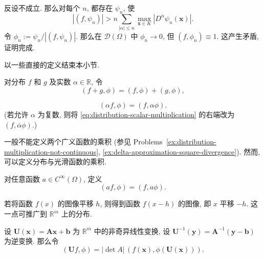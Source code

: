 \begin{Proof}
反设不成立. 那么对每个 $n$, 都存在 $\psi_n$, 使\[|(f,\psi_n)|>n\sum_{|\alpha|\leq n}\max_{\bm{x}\in K}|D^\alpha\psi_n(\bm{x})|.\]令 $\phi_n:=\psi_n/|(f,\psi_n)|$. 那么在 $\mathcal{D}(\Omega)$ 中 $\phi_n\to0$, 但 $(f,\phi_n)\equiv1$. 这产生矛盾, 证明完成.
\end{Proof}

以一些直接的定义结束本小节.

\begin{Definition}
\label{def:distribution-linear-operations}
对分布 $f$ 和 $g$ 及实数 $\alpha\in\mathbb{R}$, 令
\begin{equation}\label{eq:distribution-addition}
(f+g,\phi)=(f,\phi)+(g,\phi),
\end{equation}

\begin{equation}\label{eq:distribution-scalar-multiplication}
(\alpha f,\phi)=(f,\alpha\phi).
\end{equation}
(若允许 $\alpha$ 为复数, 则将 \eqref{eq:distribution-scalar-multiplication} 的右端改为 $(f,\overline\alpha\phi)$.)
\end{Definition}

\begin{Remark}
\label{rem:distribution-products}
一般不能定义两个广义函数的乘积 (参见 Problems~\ref{ex:distribution-multiplication-not-continuous}, \ref{ex:delta-approximation-square-divergence}). 然而, 可以定义分布与光滑函数的乘积.
\end{Remark}

\begin{Definition}
\label{def:distribution-smooth-product}
对任意函数 $a\in C^\infty(\Omega)$, 定义
\begin{equation}\label{eq:distribution-smooth-function-product}
(af,\phi)=(f,a\phi).
\end{equation}

\end{Definition}

若将函数 $f(x)$ 的图像平移 $h$, 则得到函数 $f(x-h)$ 的图像, 即 $x$ 平移 $-h$. 这一点可推广到 $\mathbb{R}^m$ 上的分布.

\begin{Definition}
\label{def:distribution-affine-change}
设 $\bm{U}(\bm{x})=\bm{A}\bm{x}+\bm{b}$ 为 $\mathbb{R}^m$ 中的非奇异线性变换, 设 $\bm{U}^{-1}(\bm{y})=\bm{A}^{-1}(\bm{y}-\bm{b})$ 为逆变换. 那么令
\begin{equation}\label{eq:distribution-affine-change-variables}
(\bm{U}f,\phi)=|\det A|\,(f(\bm{x}),\phi(\bm{U}(\bm{x}))).
\end{equation}

\end{Definition}

